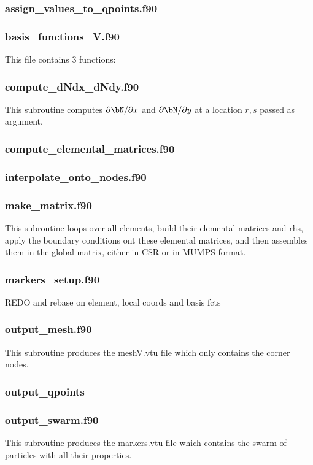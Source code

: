  \subsubsection{assign\_values\_to\_qpoints.f90}

 \subsubsection{basis\_functions\_V.f90}
 This file contains 3 functions: 
 \subsubsection{compute\_dNdx\_dNdy.f90}
 This subroutine computes $\partial{\bN}/\partial x$ and $\partial{\bN}/\partial y$
 at a location $r,s$ passed as argument.
 \subsubsection{compute\_elemental\_matrices.f90}

 \subsubsection{interpolate\_onto\_nodes.f90}

 \subsubsection{make\_matrix.f90}
 This subroutine loops over all elements, build their elemental matrices and rhs, 
 apply the boundary conditions ont these elemental matrices, and then 
 assembles them in the global matrix, either in CSR or in MUMPS format.
 \subsubsection{markers\_setup.f90}
 REDO and rebase on element, local coords and basis fcts
 \subsubsection{output\_mesh.f90}
 This subroutine produces the {\filenamefont meshV.vtu} file which only 
 contains the corner nodes.
 \subsubsection{output\_qpoints}

 \subsubsection{output\_swarm.f90}
 This subroutine produces the {\filenamefont markers.vtu} file which contains the 
 swarm of particles with all their properties.
